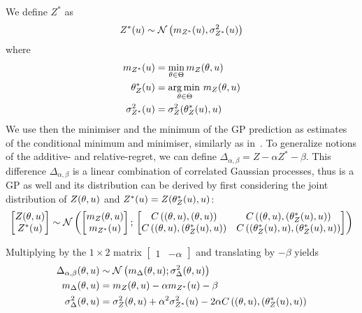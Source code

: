 \documentclass[../../Main_ManuscritThese.tex]{subfiles}
\begin{document}
We define $Z^*$ as
\begin{equation}
  Z^*(u) \sim \mathcal{N}\left(m_{Z^*}(u), \sigma^{2}_{Z^*}(u)\right)
\end{equation}
where
\begin{align}
  m_{Z^*}(u) &= \min_{\theta\in\Theta} m_Z(\theta,u) \label{eq:def_mstar}\\
  \theta_Z^*(u)&=\operatorname*{arg\,min \,}_{\theta\in\Theta} m_Z(\theta, u) \label{eq:theta_star}\\
  \sigma^{2}_{Z^*}(u) &= \sigma^{2}_Z(\theta^*_Z(u), u) \label{eq:sigma_star} 
\end{align}
We use then the minimiser and the minimum of the GP prediction as
estimates of the conditional minimum and minimiser, similarly as
in~\cite{ginsbourger_bayesian_2014}. %
To generalize notions of the additive- and relative-regret, we can
define $\Delta_{\alpha, \beta} = Z - \alpha Z^* - \beta$.  This difference
$\Delta_{\alpha,\beta}$ is a linear combination of correlated Gaussian
processes, thus is a GP as well and its distribution can be derived by
first considering the joint distribution of $Z(\theta,u)$ and
$Z^*(u) = Z(\theta_Z^*(u), u)$:
\begin{equation}
  \begin{bmatrix}
    Z(\theta,u) \\
    Z^*(u)
  \end{bmatrix}
  \sim \mathcal{N}\left(
    \begin{bmatrix}
      m_Z(\theta,u) \\
      m_{{Z^*}}(u)
    \end{bmatrix}
    ;\,
    \begin{bmatrix}
      C\left((\theta,u),(\theta,u)\right) & C\left((\theta,u),(\theta^*_Z(u),u)\right) \\
      C\left((\theta,u),(\theta_Z^*(u),u)\right) & C\left((\theta^*_Z(u),u),(\theta_Z^*(u),u)\right)
    \end{bmatrix}
  \right)
\end{equation}

Multiplying by the $1\times 2$ matrix
$\begin{bmatrix}1                & -\alpha \end{bmatrix}$ and translating by $-\beta$
yields
\begin{align}
  \Delta_{\alpha,\beta}(\theta,u) & \sim \mathcal{N}\left(m_{\Delta}(\theta,u); \sigma^2_{\Delta}(\theta,u)\right)  \label{eq:delta_GP_ab} \\
  m_{\Delta}(\theta,u)            & = m_Z(\theta,u) - \alpha m_{{Z^*}}(u) - \beta \label{eq:mu_delta_GP_ab}                             \\
  \sigma^2_{\Delta}(\theta,u)     & = \sigma_Z^2(\theta,u) + \alpha^2 \sigma_{Z^*}^2(u) - 2\alpha C\left((\theta,u),(\theta^*_Z(u),u)\right) \label{eq:variance_delta_GP_ab}
\end{align}
\end{document}
